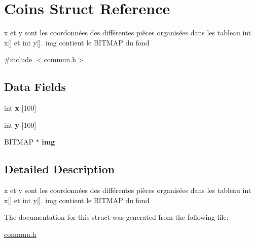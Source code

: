 \hypertarget{struct_coins}{\section{Coins Struct Reference}
\label{struct_coins}
}


x et y sont les coordonnées des différentes pièces organisées dans les tableau int x\mbox{[}\mbox{]} et int y\mbox{[}\mbox{]}. img contient le B\-I\-T\-M\-A\-P du fond  




{\ttfamily \#include $<$commun.\-h$>$}

\subsection*{Data Fields}
\begin{DoxyCompactItemize}
\item 
\hypertarget{struct_coins_a5d9353e006bc18a21e8cbdee87d36a2f}{int {\bfseries x} \mbox{[}100\mbox{]}}\label{struct_coins_a5d9353e006bc18a21e8cbdee87d36a2f}

\item 
\hypertarget{struct_coins_a76e44bc53d2efde76380be19dc9ebbc3}{int {\bfseries y} \mbox{[}100\mbox{]}}\label{struct_coins_a76e44bc53d2efde76380be19dc9ebbc3}

\item 
\hypertarget{struct_coins_a8eae42c4d58d3ee6b9aa56d0071971fa}{B\-I\-T\-M\-A\-P $\ast$ {\bfseries img}}\label{struct_coins_a8eae42c4d58d3ee6b9aa56d0071971fa}

\end{DoxyCompactItemize}


\subsection{Detailed Description}
x et y sont les coordonnées des différentes pièces organisées dans les tableau int x\mbox{[}\mbox{]} et int y\mbox{[}\mbox{]}. img contient le B\-I\-T\-M\-A\-P du fond 


\begin{DoxyItemize}
\item 
\end{DoxyItemize}

The documentation for this struct was generated from the following file\-:\begin{DoxyCompactItemize}
\item 
\hyperlink{commun_8h}{commun.\-h}\end{DoxyCompactItemize}
